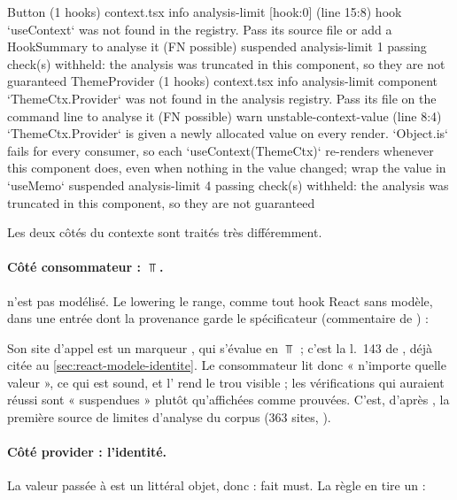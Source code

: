 \begin{sortie}
  Button  (1 hooks)  context.tsx
    info   analysis-limit  [hook:0]  (line 15:8)  hook `useContext` was not found in the registry. Pass its source file or add a HookSummary to analyse it (FN possible)
    suspended  analysis-limit  1 passing check(s) withheld: the analysis was truncated in this component, so they are not guaranteed
  ThemeProvider  (1 hooks)  context.tsx
    info   analysis-limit  component `ThemeCtx.Provider` was not found in the analysis registry. Pass its file on the command line to analyse it (FN possible)
    warn   unstable-context-value  (line 8:4)  `ThemeCtx.Provider` is given a newly allocated value on every render. `Object.is` fails for every consumer, so each `useContext(ThemeCtx)` re-renders whenever this component does, even when nothing in the value changed; wrap the value in `useMemo`
    suspended  analysis-limit  4 passing check(s) withheld: the analysis was truncated in this component, so they are not guaranteed
\end{sortie}

Les deux côtés du contexte sont traités très différemment.

\paragraph{Côté consommateur : $\Top$.}  n'est pas modélisé.
Le lowering le range, comme tout hook React sans modèle, dans une entrée
 dont la provenance garde le spécificateur 
(commentaire de ) :


Son site d'appel est un marqueur , qui s'évalue en
$\Top$ ; c'est la l.~143 de , déjà
citée au \cref{sec:react-modele-identite}. Le consommateur lit
donc « n'importe quelle valeur », ce qui est sound, et l'\Info{}
 rend le trou visible ; les vérifications qui auraient
réussi sont « suspendues » plutôt qu'affichées comme prouvées. C'est, d'après
, la première source de limites d'analyse du corpus
(363 sites, ).

\paragraph{Côté provider : l'identité.} La valeur passée à  est un
littéral objet, donc  : fait must. La règle
 en tire un \Warning{} :

